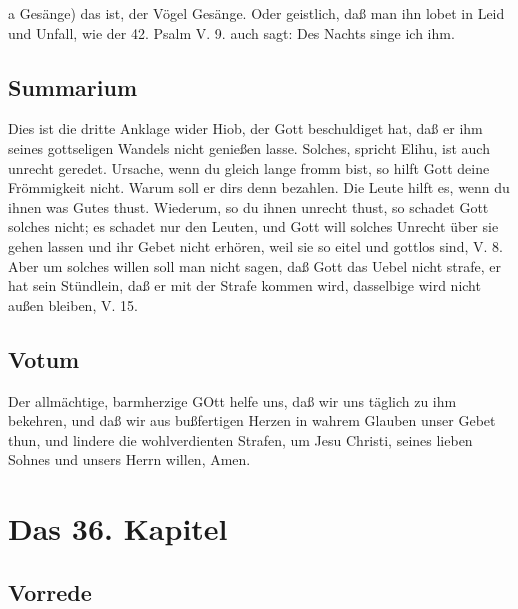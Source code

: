 a Gesänge) das ist, der Vögel Gesänge. Oder geistlich, daß man ihn lobet in Leid und Unfall, wie der 42. Psalm V. 9. auch sagt: Des Nachts singe ich ihm.

\section{Summarium}

Dies ist die dritte Anklage wider Hiob, der Gott beschuldiget hat, daß er ihm seines gottseligen Wandels nicht genießen lasse. Solches, spricht Elihu, ist auch unrecht geredet. Ursache, wenn du gleich lange fromm bist, so hilft Gott deine Frömmigkeit nicht. Warum soll er dirs denn bezahlen. Die Leute hilft es, wenn du ihnen was Gutes thust. Wiederum, so du ihnen unrecht thust, so schadet Gott solches nicht; es schadet nur den Leuten, und Gott will solches Unrecht über sie gehen lassen und ihr Gebet nicht erhören, weil sie so eitel und gottlos sind, V. 8. Aber um solches willen soll man nicht sagen, daß Gott das Uebel nicht strafe, er hat sein Stündlein, daß er mit der Strafe kommen wird, dasselbige wird nicht außen bleiben, V. 15.

\section{Votum}

Der allmächtige, barmherzige GOtt helfe uns, daß wir uns täglich zu ihm bekehren, und daß wir aus bußfertigen Herzen in wahrem Glauben unser Gebet thun, und lindere die wohlverdienten Strafen, um Jesu Christi, seines lieben Sohnes und unsers Herrn willen, Amen.

\chapter{Das 36. Kapitel}

\section{Vorrede}

